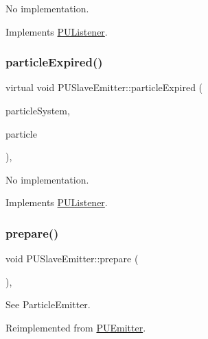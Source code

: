 No implementation. 

Implements \hyperlink{classPUListener}{P\+U\+Listener}.

\mbox{\label{classPUSlaveEmitter_ac5ed7601bfe82c693ea912b81f14732b}} 
\subsubsection{\texorpdfstring{particle\+Expired()}{particleExpired()}\hspace{0.1cm}{\footnotesize\ttfamily [2/2]}}
{\footnotesize\ttfamily virtual void P\+U\+Slave\+Emitter\+::particle\+Expired (\begin{DoxyParamCaption}\item[{\hyperlink{classPUParticleSystem3D}{P\+U\+Particle\+System3D} $\ast$}]{particle\+System,  }\item[{\hyperlink{structPUParticle3D}{P\+U\+Particle3D} $\ast$}]{particle }\end{DoxyParamCaption})\hspace{0.3cm}{\ttfamily [override]}, {\ttfamily [virtual]}}

No implementation. 

Implements \hyperlink{classPUListener}{P\+U\+Listener}.

\mbox{\label{classPUSlaveEmitter_aa7bce7be375ca983b9f599f74e55dcb8}} 
\subsubsection{\texorpdfstring{prepare()}{prepare()}\hspace{0.1cm}{\footnotesize\ttfamily [1/2]}}
{\footnotesize\ttfamily void P\+U\+Slave\+Emitter\+::prepare (\begin{DoxyParamCaption}{ }\end{DoxyParamCaption})\hspace{0.3cm}{\ttfamily [override]}, {\ttfamily [virtual]}}

See Particle\+Emitter. 

Reimplemented from \hyperlink{classPUEmitter}{P\+U\+Emitter}.

